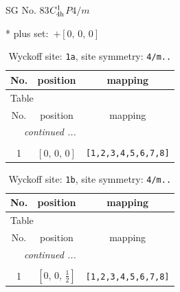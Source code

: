 \documentclass[fleqn,8pt]{jsarticle}
\begin{document}
\setcounter{MaxMatrixCols}{32}

\renewcommand{\tablename}{Table~}
\renewcommand{\figurename}{Figure~}
\begin{center}
\LARGE
SG No. 83\quad$C_{\rm 4h}^{1}$\quad$P4/m$\quad[ tetragonal ]
\end{center}
* plus set:\,\,\,$+\left[ 0,\, 0,\, 0 \right]$
\renewcommand{\arraystretch}{1.2}
\begin{longtable}{ccc}
\caption{Wyckoff site: {\tt 1a}, site symmetry: {\tt 4/m..}}
 \\
 \hline \hline
No. & position & mapping \\ \hline \endfirsthead

\multicolumn{2}{l}{\tablename\ \thetable{}} \\
 \hline \hline
No. & position & mapping \\ \hline \endhead

 \hline \hline
\multicolumn{2}{r}{\footnotesize\it continued ...} \\ \endfoot

 \hline \hline
\multicolumn{2}{r}{} \\ \endlastfoot

1 & $\left[ 0,\, 0,\, 0 \right]$ & {\tt [1,2,3,4,5,6,7,8]} \\
\end{longtable}
\renewcommand{\arraystretch}{1.2}
\begin{longtable}{ccc}
\caption{Wyckoff site: {\tt 1b}, site symmetry: {\tt 4/m..}}
 \\
 \hline \hline
No. & position & mapping \\ \hline \endfirsthead

\multicolumn{2}{l}{\tablename\ \thetable{}} \\
 \hline \hline
No. & position & mapping \\ \hline \endhead

 \hline \hline
\multicolumn{2}{r}{\footnotesize\it continued ...} \\ \endfoot

 \hline \hline
\multicolumn{2}{r}{} \\ \endlastfoot

1 & $\left[ 0,\, 0,\, \frac{1}{2} \right]$ & {\tt [1,2,3,4,5,6,7,8]} \\
\end{longtable}
\renewcommand{\arraystretch}{1.2}
\end{document}
